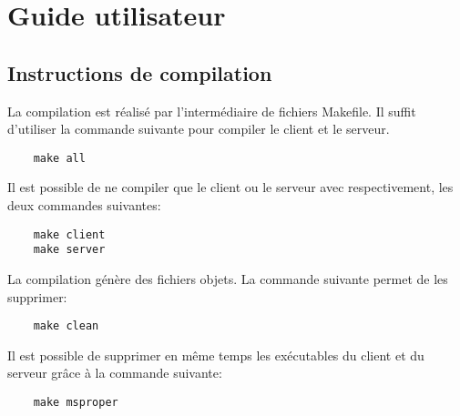 \section{Guide utilisateur}

\subsection{Instructions de compilation}

La compilation est réalisé par l'intermédiaire de fichiers Makefile. Il suffit
d'utiliser la commande suivante pour compiler le client et le serveur.
\begin{verbatim}
    make all
\end{verbatim}
Il est possible de ne compiler que le client ou le serveur avec respectivement,
les deux commandes suivantes:
\begin{verbatim}
    make client
    make server
\end{verbatim}
La compilation génère des fichiers objets. La commande suivante permet de les
supprimer:
\begin{verbatim}
    make clean
\end{verbatim}
Il est possible de supprimer en même temps les exécutables du client et du
serveur grâce à la commande suivante:
\begin{verbatim}
    make msproper
\end{verbatim}




